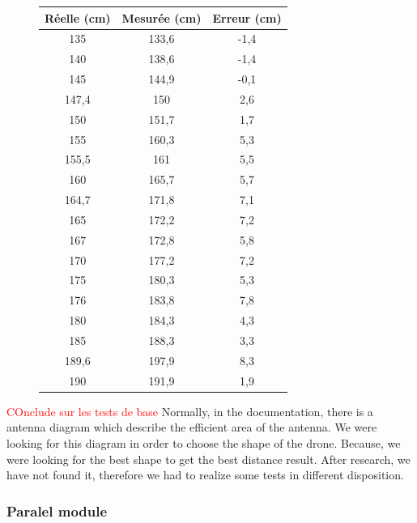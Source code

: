 \begin{figure}[H]
\begin{minipage}[t]{0.48\textwidth}
\begin{tabular}{|c|c|c|}
      Réelle (cm) & Mesurée (cm) & Erreur (cm) \\ \hline
      135   & 133,6 & -1,4 \\ \hline
      140   & 138,6 & -1,4 \\ \hline
      145   & 144,9 & -0,1 \\ \hline
      147,4 & 150   & 2,6  \\ \hline
      150   & 151,7 & 1,7  \\ \hline
      155   & 160,3 & 5,3  \\ \hline
      155,5 & 161   & 5,5  \\ \hline
      160   & 165,7 & 5,7  \\ \hline
      164,7 & 171,8 & 7,1  \\ \hline
      165   & 172,2 & 7,2  \\ \hline
      167   & 172,8 & 5,8  \\ \hline
      170   & 177,2 & 7,2  \\ \hline
      175   & 180,3 & 5,3  \\ \hline
      176   & 183,8 & 7,8  \\ \hline
      180   & 184,3 & 4,3  \\ \hline
      185   & 188,3 & 3,3  \\ \hline
      189,6 & 197,9 & 8,3  \\ \hline
      190   & 191,9 & 1,9  \\ \hline
    \end{tabular}
  \end{minipage}

\end{figure}
\textcolor{red}{COnclude sur les tests de base}
Normally, in the documentation, there is a antenna diagram which describe the efficient area of the antenna. We were looking for this diagram in order to choose the shape of the drone. Because, we were looking for the best shape to get the best distance result. After research, we have not found it, therefore we had to realize some tests in different disposition.

\subsubsection{Paralel module}

